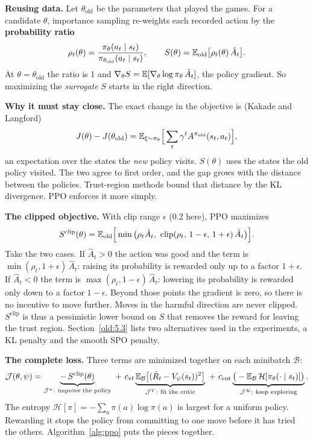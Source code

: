\textbf{Reusing data.} Let $\theta_{\text{old}}$ be the parameters that played the games. For a candidate
$\theta$, importance sampling re-weights each recorded action by the \textbf{probability ratio}
\[
\rho_t(\theta) = \frac{\pi_\theta(a_t \mid s_t)}{\pi_{\theta_{\text{old}}}(a_t \mid s_t)},
\qquad
S(\theta) = \mathbb{E}_{\text{old}}\big[\rho_t(\theta)\, \hat A_t\big].
\]
At $\theta = \theta_{\text{old}}$ the ratio is 1 and $\nabla_\theta S = \mathbb{E}[\nabla_\theta \log \pi_\theta\, \hat A_t]$, the policy
gradient. So maximizing the \emph{surrogate} $S$ starts in the right direction.

\textbf{Why it must stay close.} The exact change in the objective is (Kakade and Langford)
\[
J(\theta) - J(\theta_{\text{old}}) = \mathbb{E}_{\xi \sim \pi_\theta}\Big[\sum_t \gamma^t A^{\pi_{\text{old}}}(s_t, a_t)\Big],
\]
an expectation over the states the \emph{new} policy visits. $S(\theta)$ uses the states the old policy
visited. The two agree to first order, and the gap grows with the distance between the policies. Trust-region
methods bound that distance by the KL divergence. PPO enforces it more simply.

\textbf{The clipped objective.} With clip range $\epsilon$ (0.2 here), PPO maximizes
\begin{equation}\label{eq:clip}
S^{\text{clip}}(\theta) = \E_{\text{old}}\Big[\min\big(\rho_t \hat A_t,\ \operatorname{clip}(\rho_t,\, 1 - \epsilon,\, 1 + \epsilon)\, \hat A_t\big)\Big].
\end{equation}
Take the two cases. If $\hat A_t > 0$ the action was good and the term is $\min(\rho_t, 1 + \epsilon)\, \hat A_t$:
raising its probability is rewarded only up to a factor $1 + \epsilon$. If $\hat A_t < 0$ the term is
$\max(\rho_t, 1 - \epsilon)\, \hat A_t$: lowering its probability is rewarded only down to a factor $1 - \epsilon$.
Beyond those points the gradient is zero, so there is no incentive to move further. Moves in the harmful
direction are never clipped. $S^{\text{clip}}$ is thus a pessimistic lower bound on $S$ that removes the
reward for leaving the trust region. Section~\ref{old:5.3} lists two alternatives used in the experiments, a
KL penalty and the smooth SPO penalty.

\textbf{The complete loss.} Three terms are minimized together on each minibatch $\mathcal{B}$:
\begin{equation}\label{eq:total}
\mathcal{J}(\theta, \psi) =
\underbrace{-\,S^{\text{clip}}(\theta)}_{\mathcal{J}^\pi:\ \text{improve the policy}}
\ +\ c_{\text{vf}} \underbrace{\mathbb{E}_{\mathcal{B}}\big[(\hat R_t - V_\psi(s_t))^2\big]}_{\mathcal{J}^V:\ \text{fit the critic}}
\ +\ c_{\text{ent}} \underbrace{\big(-\mathbb{E}_{\mathcal{B}}\,\mathcal{H}[\pi_\theta(\cdot \mid s_t)]\big)}_{\mathcal{J}^{\mathcal{H}}:\ \text{keep exploring}} .
\end{equation}
The entropy $\mathcal{H}[\pi] = -\sum_a \pi(a) \log \pi(a)$ is largest for a uniform policy. Rewarding it stops
the policy from committing to one move before it has tried the others. Algorithm~\ref{alg:ppo} puts the
pieces together.

